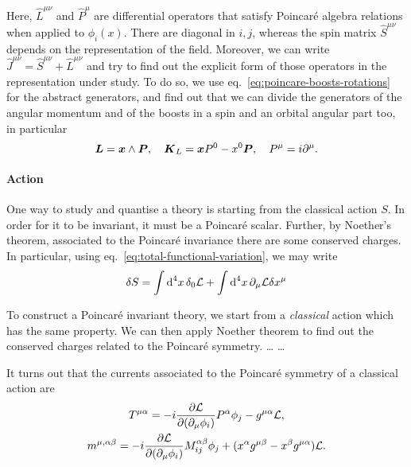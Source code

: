 Here, $\hat{L}^{\mu\nu}$ and $\hat{P}^\mu$ are differential operators that satisfy Poincaré algebra relations when applied to $\phi_i(x)$. There are diagonal in $i,j$, whereas the spin matrix $\hat{S}^{\mu\nu}$ depends on the representation of the field. Moreover, we can write $\hat{J}^{\mu\nu} = \hat{S}^{\mu\nu} + \hat{L}^{\mu\nu}$ and try to find out the explicit form of those operators in the representation under study. To do so, we use eq.~\eqref{eq:poincare-boosts-rotations} for the abstract generators, and find out that we can divide the generators of the angular momentum and of the boosts in a spin and an orbital angular part too, in particular
\begin{equation}
    \boldsymbol{L} = \boldsymbol{x} \wedge \boldsymbol{P}, \quad \boldsymbol{K}_L = \boldsymbol{x} P^0 - x^0 \boldsymbol{P}, \quad P^\mu = i \partial^\mu .
\end{equation}


\paragraph{Action}
One way to study and quantise a theory is starting from the classical action $S$. In order for it to be invariant, it must be a Poincaré scalar. Further, by Noether's theorem, associated to the Poincaré invariance there are some conserved charges. In particular, using eq.~\eqref{eq:total-functional-variation}, we may write
\begin{equation}
    \delta S = \int {\mathop{}\!\mathrm{d}}^4 x \, \delta_0 \mathcal{L} + \int {\mathop{}\!\mathrm{d}}^4 x \, \partial_\mu \mathcal{L} \delta x^\mu
\end{equation}



To construct a Poincaré invariant theory, we start from a \emph{classical} action which has the same property. We can then apply Noether theorem to find out the conserved charges related to the Poincaré symmetry. 
\dots
\dots

It turns out that the currents associated to the Poincaré symmetry of a classical action are
\begin{subequations}
\begin{gather}
T^{\mu\alpha} = -i \frac{\partial \mathcal{L}}{\partial(\partial_\mu \phi_i)} P^\alpha \phi_j - g^{\mu\alpha} \mathcal{L} , \\
m^{\mu,\alpha\beta} = -i \frac{\partial \mathcal{L}}{\partial (\partial_\mu \phi_i)} M^{\alpha\beta}_{ij} \phi_j + (x^\alpha g^{\mu\beta} - x^\beta g^{\mu\alpha}) \mathcal{L} .
\end{gather}
\end{subequations}

